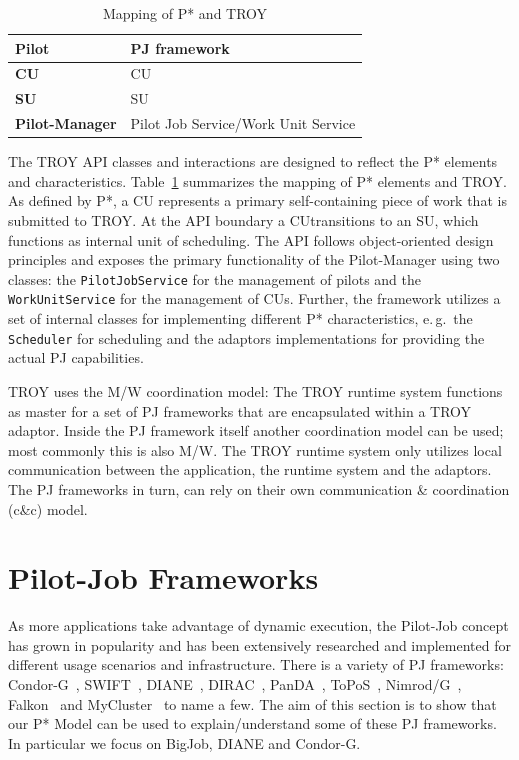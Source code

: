 \documentclass[conference,final]{IEEEtran}
\newcommand{\cu}{CU}
\newcommand{\upp}{\vspace*{-0.5em}}
\begin{document}
\begin{table}[t]
	\centering
\begin{tabular}{|l|l|}
\hline
\textbf{Pilot} &PJ framework\\
\hline
\textbf{\cu } &\cu \\
\hline
\textbf{SU} &SU\\
\hline
\textbf{Pilot-Manager} & Pilot Job Service/Work Unit Service\\
\hline
\end{tabular}
\caption{Mapping of P* and TROY\upp\upp}\label{table:pstar_elements}
\end{table}

The TROY API classes and interactions are designed to reflect the P*
elements and characteristics. Table~\ref{table:pstar_elements}
summarizes the mapping of P* elements and TROY. As defined by P*, a \cu 
represents a primary self-containing piece of work that is submitted
to TROY. At the API boundary a \cu  transitions to an SU, which
functions as internal unit of scheduling.  The API follows
object-oriented design principles and exposes the primary
functionality of the Pilot-Manager using two classes: the
\texttt{PilotJobService} for the management of pilots and the
\texttt{WorkUnitService} for the management of \cu s. Further, the
framework utilizes a set of internal classes for implementing
different P* characteristics, e.\,g.\ the \texttt{Scheduler} for
scheduling and the adaptors implementations for providing the actual
PJ capabilities.

TROY uses the M/W coordination model: The TROY runtime system
functions as master for a set of PJ frameworks that are encapsulated
within a TROY adaptor. Inside the PJ framework itself another
coordination model can be used; most commonly this is also M/W. The
TROY runtime system only utilizes local communication between the
application, the runtime system and the adaptors. The PJ frameworks in
turn, can rely on their own communication \& coordination (c\&c)
model.

\section{Pilot-Job Frameworks\upp\upp}

As more applications take advantage of dynamic execution, the
Pilot-Job concept has grown in popularity and has been extensively
researched and implemented for different usage scenarios and
infrastructure. There is a variety of PJ frameworks:
Condor-G~\cite{condor-g}, SWIFT~\cite{Wilde2011},
DIANE~\cite{Moscicki:908910}, DIRAC~\cite{1742-6596-219-6-062049},
PanDA~\cite{1742-6596-219-6-062041}, ToPoS~\cite{topos},
Nimrod/G~\cite{10.1109/HPC.2000.846563}, Falkon~\cite{1362680} and
MyCluster~\cite{1652061} to name a few. The aim of this section is to
show that our P* Model can be used to explain/understand some of these
PJ frameworks. In particular we focus on BigJob, DIANE and Condor-G.
\end{document}
